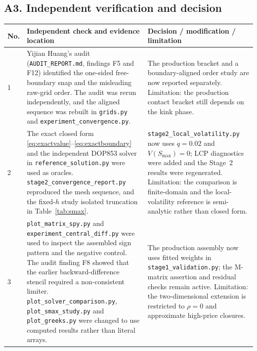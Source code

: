 \documentclass[11pt,a4paper]{article}
\theoremstyle{definition}
\theoremstyle{remark}
\begin{document}
\subsection*{A3. Independent verification and decision}
\begin{table}[H]
\centering
\scriptsize
\setlength{\tabcolsep}{4pt}
\begin{tabular}{@{}p{}p{}p{}@{}}
\toprule
\textbf{No.} & \textbf{Independent check and evidence location} & \textbf{Decision / modification / limitation} \\
\midrule
1 & Yijian Huang's audit (\texttt{AUDIT\_REPORT.md}, findings F5 and F12)
identified the one-sided free-boundary snap and the misleading raw-grid order.
The audit was rerun independently, and the aligned sequence was rebuilt in
\texttt{grids.py} and \texttt{experiment\_convergence.py}. & The production
bracket and a boundary-aligned order study are now reported separately.
Limitation: the production contact bracket still depends on the kink phase. \\
2 & The exact closed form \eqref{eq:exactvalue}--\eqref{eq:exactboundary} and
the independent DOP853 solver in \texttt{reference\_solution.py} were used as
oracles. \texttt{stage2\_convergence\_report.py} reproduced the mesh sequence,
and the fixed-$h$ study isolated truncation in Table~\ref{tab:smax}. &
\texttt{stage2\_local\_volatility.py} now uses $q=0.02$ and
$V(S_{\max})=0$; LCP diagnostics were added and the Stage~2 results were
regenerated. Limitation: the comparison is finite-domain and the local-volatility
reference is semi-analytic rather than closed form. \\
3 & \texttt{plot\_matrix\_spy.py} and \texttt{experiment\_central\_diff.py}
were used to inspect the assembled sign pattern and the negative control.
The audit finding F8 showed that the earlier backward-difference stencil
required a non-consistent limiter. \texttt{plot\_solver\_comparison.py},
\texttt{plot\_smax\_study.py} and \texttt{plot\_greeks.py} were changed to use
computed results rather than literal arrays. & The production assembly now
uses fitted weights in \texttt{stage1\_validation.py}; the M-matrix assertion
and residual checks remain active. Limitation: the two-dimensional extension
is restricted to $\rho=0$ and approximate high-price closures. \\
\bottomrule
\end{tabular}
\end{table}
\end{document}
